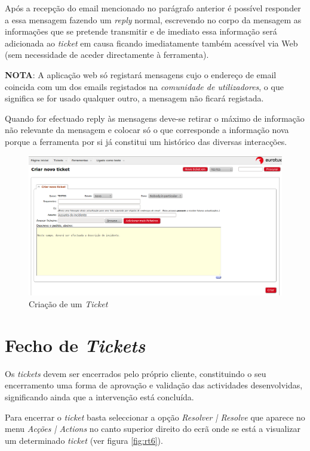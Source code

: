 Após a recepção do email mencionado no parágrafo anterior é possível responder a essa mensagem fazendo um \emph{reply} normal, escrevendo no corpo da mensagem as informações que se pretende transmitir e de imediato essa informação será adicionada ao \emph{ticket} em causa ficando imediatamente também acessível via Web (sem necessidade de aceder directamente à ferramenta). 

\textbf{NOTA}: A aplicação web só registará mensagens cujo o endereço de email coincida com um dos emails registados na \emph{comunidade de utilizadores}, o que significa se for usado qualquer outro, a mensagem não ficará registada.

Quando for efectuado reply às mensagens deve-se retirar o máximo de informação não relevante da mensagem e colocar só o que corresponde a informação nova porque a ferramenta por si já constitui um histórico das diversas interacções.


\begin{figure}[H]
\begin{center}
\includegraphics[width=16cm]{include/img/rt3-1-PT}
\end{center}
\caption{Criação de um \emph{Ticket}}
\label{fig:rt3}
\end{figure}

\section{Fecho de \emph{Tickets}}
Os \emph{tickets} devem ser encerrados pelo próprio cliente, constituindo o seu encerramento uma forma de aprovação e validação das actividades desenvolvidas, significando ainda que a intervenção está concluída.

Para encerrar o \emph{ticket} basta seleccionar a opção \emph{Resolver | Resolve} que aparece no menu \emph{Acções | Actions} no canto superior direito do ecrã onde se está a visualizar um determinado \emph{ticket} (ver figura \ref{fig:rt6}).

